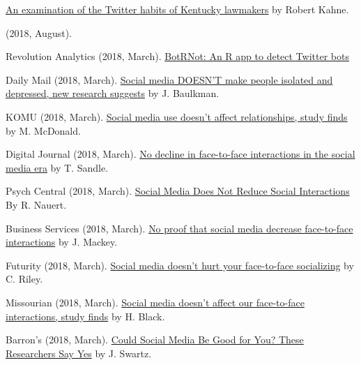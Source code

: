 \begin{bibenum}
      \href{https://www.leoweekly.com/2018/01/kentucky-legislature-twitter-analysis/}{An examination of the Twitter habits of Kentucky lawmakers} by Robert Kahne.
    \item[]  (2018, August).
      \href{}{}
    \item[] Revolution Analytics (2018, March).
      \href{http://blog.revolutionanalytics.com/2018/03/twitter-bot-or-not.html}{BotRNot: An R app to detect Twitter bots}
    \item[] Daily Mail (2018, March).
      \href{http://www.dailymail.co.uk/health/article-5455279/Facebook-does-NOT-decrease-social-interaction.html}{Social media DOESN'T make people isolated and depressed, new research suggests} by J. Baulkman.
    \item[] KOMU (2018, March).
      \href{http://www.komu.com/news/social-media-use-doesn-t-affect-relationships-study-finds}{Social media use doesn't affect relationships, study finds} by M. McDonald.
    \item[] Digital Journal (2018, March).
      \href{http://www.digitaljournal.com/tech-and-science/technology/no-decline-in-face-to-face-interactions-in-the-social-media-era/article/516359}{No decline in face-to-face interactions in the social media era} by T. Sandle.
    \item[] Psych Central (2018, March).
      \href{https://psychcentral.com/news/2018/03/02/social-media-does-not-reduce-social-interactions/133209.html}{Social Media Does Not Reduce Social Interactions} By R. Nauert.
    \item[] Business Services (2018, March).
      \href{http://businessservices24.com/44/no-proof-that-social-media-decrease-face-to-face-interactions/}{No proof that social media decrease face-to-face interactions} by J. Mackey.
    \item[] Futurity (2018, March).
      \href{http://www.futurity.org/social-media-social-interactions-1692872/}{Social media doesn’t hurt your face-to-face socializing} by C. Riley.
    \item[] Missourian (2018, March).
      \href{https://www.columbiamissourian.com/news/higher_education/social-media-doesn-t-affect-our-face-to-face-interactions/}{Social media doesn't affect our face-to-face interactions, study finds} by H. Black.
    \item[] Barron's (2018, March).
      \href{https://www.barrons.com/articles/could-social-media-be-good-for-you-these-researchers-say-yes-1519932207}{Could Social Media Be Good for You? These Researchers Say Yes} by J. Swartz.

\end{bibenum}
